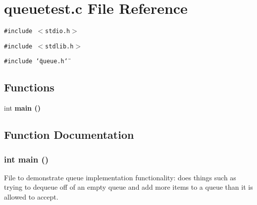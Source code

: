 \section{queuetest.c File Reference}
\label{queuetest_8c}
{\tt \#include $<$stdio.h$>$}\par
{\tt \#include $<$stdlib.h$>$}\par
{\tt \#include \char`\"{}queue.h\char`\"{}}\par
\subsection*{Functions}
\begin{CompactItemize}
\item 
int \bf{main} ()
\end{CompactItemize}


\subsection{Function Documentation}
\subsubsection{\setlength{\rightskip}{0pt plus 5cm}int main ()}\label{queuetest_8c_e66f6b31b5ad750f1fe042a706a4e3d4}


File to demonstrate queue implementation functionality: does things such as trying to dequeue off of an empty queue and add more items to a queue than it is allowed to accept. 